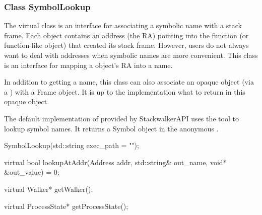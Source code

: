\subsubsection{Class SymbolLookup}

The  virtual class is an interface for associating a symbolic
name with a stack frame. Each  object contains an address (the RA)
pointing into the function (or function-like object) that created its stack
frame. However, users do not always want to deal with addresses when symbolic
names are more convenient. This class is an interface for mapping a  object's RA into a name.

In addition to getting a name, this class can also associate an opaque object
(via a ) with a Frame object. It is up to the 
implementation what to return in this opaque object.

The default implementation of  provided by StackwalkerAPI
uses the  tool to lookup symbol names. It returns a Symbol
object in the anonymous .

\begin{apient}
SymbolLookup(std::string exec_path = "");
\end{apient}

\begin{apient}
virtual bool lookupAtAddr(Address addr,
                          std::string& out_name,
                          void* &out_value) = 0;
\end{apient}

\begin{apient}
virtual Walker* getWalker();
\end{apient}

\begin{apient}
virtual ProcessState* getProcessState();
\end{apient}

